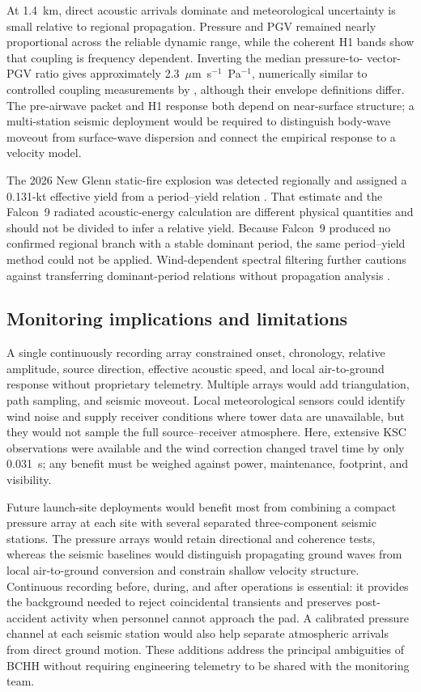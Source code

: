 \documentclass[]{seismica}
\begin{document}
At 1.4~km, direct acoustic arrivals dominate and meteorological uncertainty is
small relative to regional propagation. Pressure and PGV remained nearly
proportional across the reliable dynamic range, while the coherent H1 bands
show that coupling is frequency dependent. Inverting the median pressure-to-
vector-PGV ratio gives approximately
2.3~$\mu$m~s$^{-1}$~Pa$^{-1}$, numerically similar to controlled coupling
measurements by \citet{novoselov_ground_coupling_2020}, although their envelope
definitions differ. The pre-airwave packet and H1 response both depend on
near-surface structure; a multi-station seismic deployment would be required
to distinguish body-wave moveout from surface-wave dispersion and connect the
empirical response to a velocity model.

The 2026 New Glenn static-fire explosion was detected regionally and assigned
a 0.131-kt effective yield from a period--yield relation
\citep{silber_scamfer_newglenn_2026}. That estimate and the Falcon~9 radiated
acoustic-energy calculation are different physical quantities and should not
be divided to infer a relative yield. Because Falcon~9 produced no confirmed
regional branch with a stable dominant period, the same period--yield method
could not be applied. Wind-dependent spectral filtering further cautions
against transferring dominant-period relations without propagation analysis
\citep{silber_wind_filtering_2026}.

\subsection{Monitoring implications and limitations}

A single continuously recording array constrained onset, chronology, relative
amplitude, source direction, effective acoustic speed, and local air-to-ground
response without proprietary telemetry. Multiple arrays would add
triangulation, path sampling, and seismic moveout. Local meteorological sensors
could identify wind noise and supply receiver conditions where tower data are
unavailable, but they would not sample the full source--receiver atmosphere.
Here, extensive KSC observations were available and the wind correction changed
travel time by only 0.031~s; any benefit must be weighed against power,
maintenance, footprint, and visibility.

Future launch-site deployments would benefit most from combining a compact
pressure array at each site with several separated three-component seismic
stations. The pressure arrays would retain directional and coherence tests,
whereas the seismic baselines would distinguish propagating ground waves from
local air-to-ground conversion and constrain shallow velocity structure.
Continuous recording before, during, and after operations is essential: it
provides the background needed to reject coincidental transients and preserves
post-accident activity when personnel cannot approach the pad. A calibrated
pressure channel at each seismic station would also help separate atmospheric
arrivals from direct ground motion. These additions address the principal
ambiguities of BCHH without requiring engineering telemetry to be shared with
the monitoring team.
\end{document}
